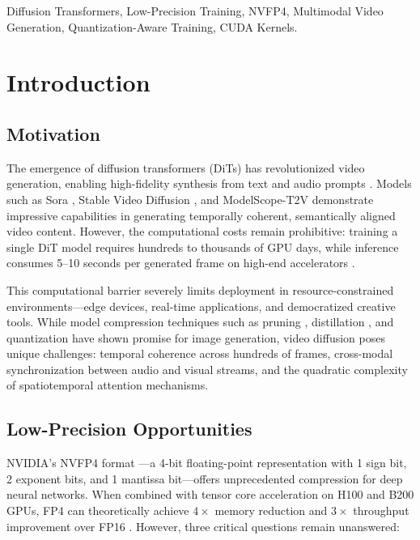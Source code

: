 \documentclass[journal]{IEEEtran}
\theoremstyle{definition}
\theoremstyle{remark}
\begin{document}
\begin{IEEEkeywords}
Diffusion Transformers, Low-Precision Training, NVFP4, Multimodal Video Generation, Quantization-Aware Training, CUDA Kernels.
\end{IEEEkeywords}

\section{Introduction}

\subsection{Motivation}
The emergence of diffusion transformers (DiTs) \cite{peebles2023scalable} has revolutionized video generation, enabling high-fidelity synthesis from text and audio prompts \cite{ho2022imagen, singer2023make, rombach2022high}. Models such as Sora \cite{openai2024sora}, Stable Video Diffusion \cite{stability2023svd}, and ModelScope-T2V \cite{wang2023modelscope} demonstrate impressive capabilities in generating temporally coherent, semantically aligned video content. However, the computational costs remain prohibitive: training a single DiT model requires hundreds to thousands of GPU days, while inference consumes 5--10 seconds per generated frame on high-end accelerators \cite{zhang2024analyzing, gupta2024efficient}.

This computational barrier severely limits deployment in resource-constrained environments---edge devices, real-time applications, and democratized creative tools. While model compression techniques such as pruning \cite{han2016deep}, distillation \cite{hinton2014distilling}, and quantization \cite{jacob2018quantization} have shown promise for image generation, video diffusion poses unique challenges: temporal coherence across hundreds of frames, cross-modal synchronization between audio and visual streams, and the quadratic complexity of spatiotemporal attention mechanisms.

\subsection{Low-Precision Opportunities}
NVIDIA's NVFP4 format \cite{nvidia2024nvfp4}---a 4-bit floating-point representation with 1 sign bit, 2 exponent bits, and 1 mantissa bit---offers unprecedented compression for deep neural networks. When combined with tensor core acceleration on H100 and B200 GPUs, FP4 can theoretically achieve $4\times$ memory reduction and $3\times$ throughput improvement over FP16 \cite{nvidia2022h100}. However, three critical questions remain unanswered:
\end{document}
